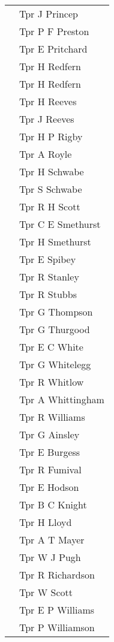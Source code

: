 \begin{center}
\begin{tabular}{rl}
    & Tpr J Princep \\
    & Tpr P F Preston \\
    & Tpr E Pritchard \\
    & Tpr H Redfern \\
    & Tpr H Redfern \\
    & Tpr H Reeves \\
    & Tpr J Reeves \\
    & Tpr H P Rigby \\
    & Tpr A Royle \\
    & Tpr H Schwabe \\
    & Tpr S Schwabe \\
    & Tpr R H Scott \\
    & Tpr C E Smethurst \\
    & Tpr H Smethurst \\
    & Tpr E Spibey \\
    & Tpr R Stanley \\
    & Tpr R Stubbs \\
    & Tpr G Thompson \\
    & Tpr G Thurgood \\
    & Tpr E C White \\
    & Tpr G Whitelegg \\
    & Tpr R Whitlow \\
    & Tpr A Whittingham \\
    & Tpr R Williams \\
    & Tpr G Ainsley \\
    & Tpr E Burgess \\
    & Tpr R Fumival \\
    & Tpr E Hodson \\
    & Tpr B C Knight \\
    & Tpr H Lloyd \\
    & Tpr A T Mayer \\
    & Tpr W J Pugh \\
    & Tpr R Richardson \\
    & Tpr W Scott \\
    & Tpr E P Williams \\
    & Tpr P Williamson \\
  \end{tabular}
\end{center}
